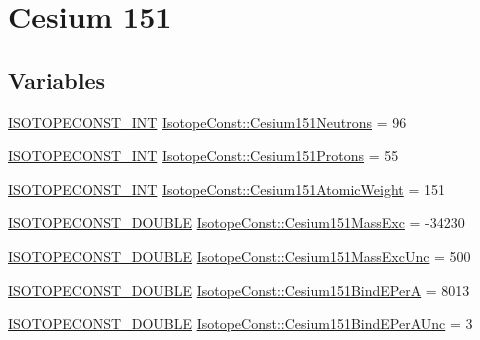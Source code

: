 \hypertarget{group___isotope_const-_cesium-_cs151}{}\section{Cesium 151}
\label{group___isotope_const-_cesium-_cs151}
\subsection*{Variables}
\begin{DoxyCompactItemize}
\item 
\mbox{\hyperlink{group___isotope_const-_macros_ga5f18360b3e99483a35c32d789e62621c}{I\+S\+O\+T\+O\+P\+E\+C\+O\+N\+S\+T\+\_\+\+I\+NT}} \mbox{\hyperlink{group___isotope_const-_cesium-_cs151_ga8241d912cf5ec4cbb15ffb349d711ab2}{Isotope\+Const\+::\+Cesium151\+Neutrons}} = 96
\item 
\mbox{\hyperlink{group___isotope_const-_macros_ga5f18360b3e99483a35c32d789e62621c}{I\+S\+O\+T\+O\+P\+E\+C\+O\+N\+S\+T\+\_\+\+I\+NT}} \mbox{\hyperlink{group___isotope_const-_cesium-_cs151_gaf2cad4fb0009eba365def40200c6cb2b}{Isotope\+Const\+::\+Cesium151\+Protons}} = 55
\item 
\mbox{\hyperlink{group___isotope_const-_macros_ga5f18360b3e99483a35c32d789e62621c}{I\+S\+O\+T\+O\+P\+E\+C\+O\+N\+S\+T\+\_\+\+I\+NT}} \mbox{\hyperlink{group___isotope_const-_cesium-_cs151_gad7c56b02a8d6fdda0a9befdcb9afc032}{Isotope\+Const\+::\+Cesium151\+Atomic\+Weight}} = 151
\item 
\mbox{\hyperlink{group___isotope_const-_macros_ga8f45a7272ce02c0b4c65c44636ed719a}{I\+S\+O\+T\+O\+P\+E\+C\+O\+N\+S\+T\+\_\+\+D\+O\+U\+B\+LE}} \mbox{\hyperlink{group___isotope_const-_cesium-_cs151_ga7dd7f25ae2a9e0e563a43b4bf31e53e1}{Isotope\+Const\+::\+Cesium151\+Mass\+Exc}} = -\/34230
\item 
\mbox{\hyperlink{group___isotope_const-_macros_ga8f45a7272ce02c0b4c65c44636ed719a}{I\+S\+O\+T\+O\+P\+E\+C\+O\+N\+S\+T\+\_\+\+D\+O\+U\+B\+LE}} \mbox{\hyperlink{group___isotope_const-_cesium-_cs151_ga265539bdf167ef1dd80c8568d379ede8}{Isotope\+Const\+::\+Cesium151\+Mass\+Exc\+Unc}} = 500
\item 
\mbox{\hyperlink{group___isotope_const-_macros_ga8f45a7272ce02c0b4c65c44636ed719a}{I\+S\+O\+T\+O\+P\+E\+C\+O\+N\+S\+T\+\_\+\+D\+O\+U\+B\+LE}} \mbox{\hyperlink{group___isotope_const-_cesium-_cs151_gac76041f145bae2b00cb607f51c2621ef}{Isotope\+Const\+::\+Cesium151\+Bind\+E\+PerA}} = 8013
\item 
\mbox{\hyperlink{group___isotope_const-_macros_ga8f45a7272ce02c0b4c65c44636ed719a}{I\+S\+O\+T\+O\+P\+E\+C\+O\+N\+S\+T\+\_\+\+D\+O\+U\+B\+LE}} \mbox{\hyperlink{group___isotope_const-_cesium-_cs151_ga6ac15e3e7672c8be5c7bc5ae17f28a32}{Isotope\+Const\+::\+Cesium151\+Bind\+E\+Per\+A\+Unc}} = 3

\end{DoxyCompactItemize}
